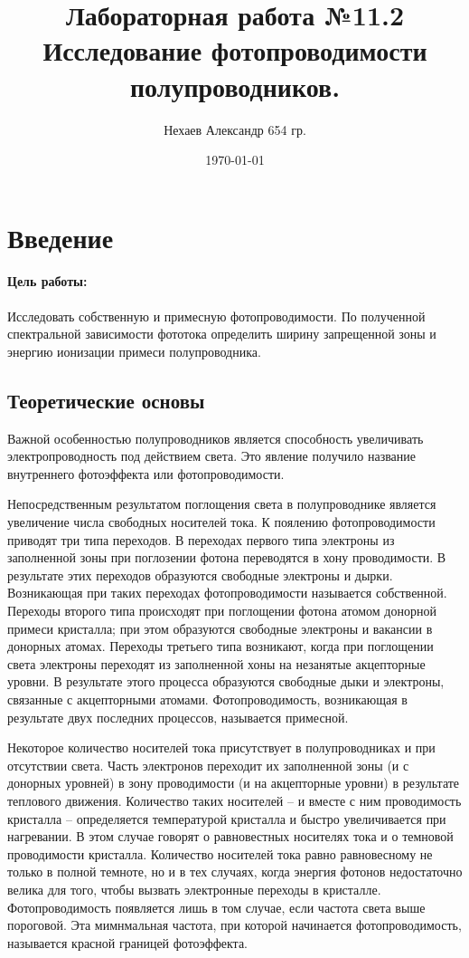 \documentclass[a4paper, 12pt]{article}
\begin{document}
	\title{Лабораторная работа №11.2\\Исследование фотопроводимости полупроводников.}
	\author{Нехаев Александр 654 гр.}
	\date{\today}
	\maketitle
	\tableofcontents
	\section{Введение}
	\paragraph{Цель работы:}
	Исследовать собственную и примесную фотопроводимости. По полученной спектральной зависимости фототока определить ширину запрещенной зоны и энергию ионизации примеси полупроводника.
	\subsection{Теоретические основы}
	Важной особенностью полупроводников является способность увеличивать электропроводность под действием света. Это явление получило название внутреннего фотоэффекта или фотопроводимости.

	Непосредственным результатом поглощения света в полупроводнике является увеличение числа свободных носителей тока. К поялению фотопроводимости приводят три типа переходов. В переходах первого типа электроны из заполненной зоны при поглозении фотона переводятся в хону проводимости. В результате этих переходов образуются свободные электроны и дырки. Возникающая при таких переходах фотопроводимости называется собственной. Переходы второго типа происходят при поглощении фотона атомом донорной примеси кристалла; при этом образуются свободные электроны и вакансии в донорных атомах. Переходы третьего типа возникают, когда при поглощении света электроны переходят из заполненной хоны на незанятые акцепторные уровни. В результате этого процесса образуются свободные дыки и электроны, связанные с акцепторными атомами. Фотопроводимость, возникающая в результате двух последних процессов, называется примесной.

	Некоторое количество носителей тока присутствует в полупроводниках и при отсутствии света. Часть электронов переходит их заполненной зоны (и с донорных уровней) в зону проводимости (и на акцепторные уровни) в результате теплового движения. Количество таких носителей -- и вместе с ним проводимость кристалла -- определяется температурой кристалла и быстро увеличивается при нагревании. В этом случае говорят о равновестных носителях тока и о темновой проводимости кристалла. Количество носителей тока равно равновесному не только в полной темноте, но и в тех случаях, когда энергия фотонов недостаточно велика для того, чтобы вызвать электронные переходы в кристалле. Фотопроводимость появляется лишь в том случае, если частота света выше пороговой. Эта мимнмальная частота, при которой начинается фотопроводимость, называется красной границей фотоэффекта.
	
\end{document}
